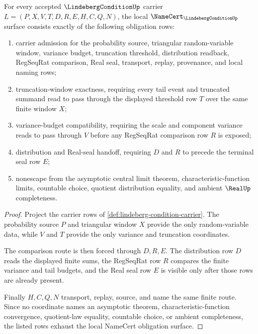 \begin{theorem}
\label{thm:lindeberg-condition-namecert-obligations}
For every accepted $\LindebergConditionUp$ carrier $L=(P,X,V,T,D,R,E,H,C,Q,N)$, the local $\NameCert_{\LindebergConditionUp}$ surface consists exactly of the following obligation rows:
\begin{enumerate}
\item carrier admission for the probability source, triangular random-variable window, variance budget, truncation threshold, distribution readback, RegSeqRat comparison, Real seal, transport, replay, provenance, and local naming rows;
\item truncation-window exactness, requiring every tail event and truncated summand read to pass through the displayed threshold row $T$ over the same finite window $X$;
\item variance-budget compatibility, requiring the scale and component variance reads to pass through $V$ before any RegSeqRat comparison row $R$ is exposed;
\item distribution and Real-seal handoff, requiring $D$ and $R$ to precede the terminal seal row $E$;
\item nonescape from the asymptotic central limit theorem, characteristic-function limits, countable choice, quotient distribution equality, and ambient $\RealUp$ completeness.
\end{enumerate}
\end{theorem}
\begin{proof}
Project the carrier rows of \autoref{def:lindeberg-condition-carrier}. The probability source $P$ and triangular window $X$ provide the only random-variable data, while $V$ and $T$ provide the only variance and truncation coordinates.

The comparison route is then forced through $D,R,E$. The distribution row $D$ reads the displayed finite sums, the RegSeqRat row $R$ compares the finite variance and tail budgets, and the Real seal row $E$ is visible only after those rows are already present.

Finally $H,C,Q,N$ transport, replay, source, and name the same finite route. Since no coordinate names an asymptotic theorem, characteristic-function convergence, quotient-law equality, countable choice, or ambient completeness, the listed rows exhaust the local NameCert obligation surface.
\end{proof}

